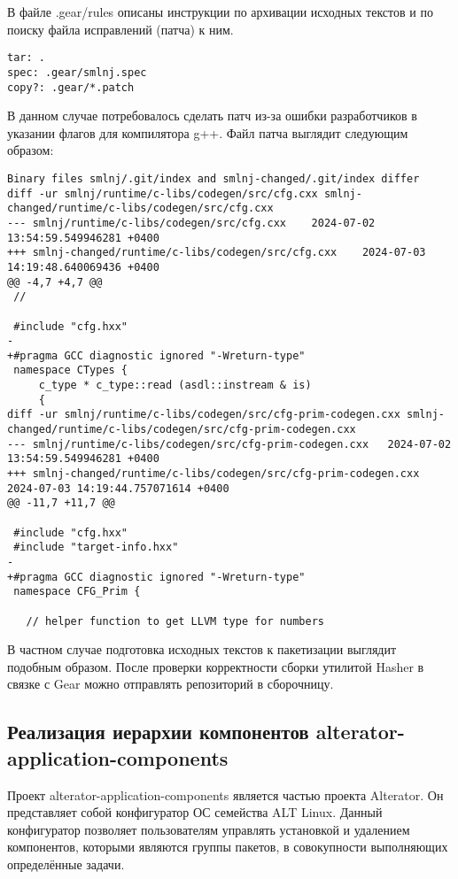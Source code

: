 \documentclass[bachelor, och, pract]{SCWorks}
\begin{document}
В файле .gear/rules описаны инструкции по архивации исходных текстов и по поиску файла исправлений (патча) к ним.

\begin{verbatim}
tar: .
spec: .gear/smlnj.spec
copy?: .gear/*.patch
\end{verbatim}

В данном случае потребовалось сделать патч из-за ошибки разработчиков в указании флагов для компилятора g++.
Файл патча выглядит следующим образом:

\begin{verbatim}
Binary files smlnj/.git/index and smlnj-changed/.git/index differ
diff -ur smlnj/runtime/c-libs/codegen/src/cfg.cxx smlnj-changed/runtime/c-libs/codegen/src/cfg.cxx
--- smlnj/runtime/c-libs/codegen/src/cfg.cxx	2024-07-02 13:54:59.549946281 +0400
+++ smlnj-changed/runtime/c-libs/codegen/src/cfg.cxx	2024-07-03 14:19:48.640069436 +0400
@@ -4,7 +4,7 @@
 //
 
 #include "cfg.hxx"
-
+#pragma GCC diagnostic ignored "-Wreturn-type"
 namespace CTypes {
     c_type * c_type::read (asdl::instream & is)
     {
diff -ur smlnj/runtime/c-libs/codegen/src/cfg-prim-codegen.cxx smlnj-changed/runtime/c-libs/codegen/src/cfg-prim-codegen.cxx
--- smlnj/runtime/c-libs/codegen/src/cfg-prim-codegen.cxx	2024-07-02 13:54:59.549946281 +0400
+++ smlnj-changed/runtime/c-libs/codegen/src/cfg-prim-codegen.cxx	2024-07-03 14:19:44.757071614 +0400
@@ -11,7 +11,7 @@
 
 #include "cfg.hxx"
 #include "target-info.hxx"
-
+#pragma GCC diagnostic ignored "-Wreturn-type"
 namespace CFG_Prim {
 
   // helper function to get LLVM type for numbers
\end{verbatim}

В частном случае подготовка исходных текстов к пакетизации выглядит подобным образом.
После проверки корректности сборки утилитой Hasher в связке с Gear можно отправлять репозиторий в сборочницу.

\subsection{Реализация иерархии компонентов alterator-application-components}

Проект alterator-application-components является частью проекта Alterator.
Он представляет собой конфигуратор ОС семейства ALT Linux.
Данный конфигуратор позволяет пользователям управлять установкой и удалением компонентов, которыми являются группы пакетов, в совокупности выполняющих определённые задачи.
\end{document}
